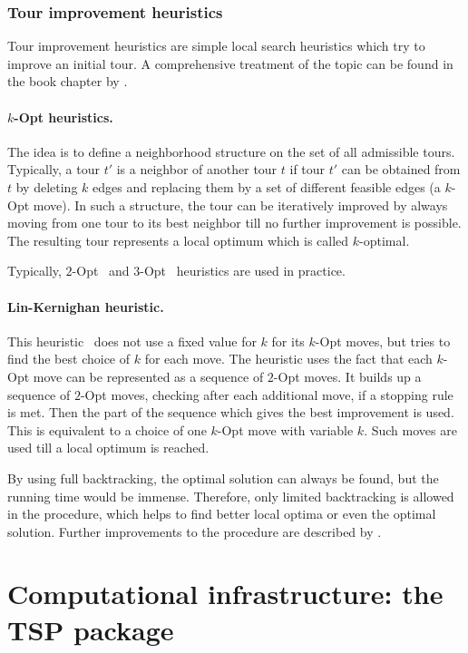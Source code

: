 \documentclass[10pt,a4paper,fleqn]{article}
\begin{document}
\subsubsection{Tour improvement heuristics}

Tour improvement heuristics are simple local search heuristics which try to
improve an initial tour. A comprehensive treatment of the topic
can be found in the book chapter by \cite{Rego2002}.

\paragraph{$k$-Opt heuristics.} The idea is to define a neighborhood structure
on the set of all admissible tours. Typically, a tour $t'$ is a neighbor of
another tour $t$ if tour $t'$ can be obtained from $t$ by deleting $k$ edges
and replacing them by a set of different feasible edges (a $k$-Opt move).  In
such a structure, the tour can be iteratively improved by always moving from
one tour to its best neighbor till no further improvement is possible. The
resulting tour represents a local optimum which is called $k$-optimal.

Typically, $2$-Opt~\citep{Croes1958} and $3$-Opt~\citep{Lin1965} heuristics
are used in practice.

\paragraph{Lin-Kernighan heuristic.}
This heuristic~\citep{Lin1973} does not use a fixed value for $k$ for its
$k$-Opt moves, but tries to find the best choice of $k$ for each move.  The
heuristic uses the fact that each $k$-Opt move can be represented as a sequence
of $2$-Opt moves.  It builds up a sequence of $2$-Opt moves, checking after
each additional move, if a stopping rule is met. Then the part of the sequence
which gives the best improvement is used. This is equivalent to a choice of one
$k$-Opt move with variable $k$. Such moves are used till a local optimum
is reached. 

By using full backtracking, the optimal solution can always be found, but the
running time would be immense. Therefore, only limited backtracking is allowed
in the procedure, which helps to find better local optima or even the optimal
solution. Further improvements to the procedure are described 
by \cite{Lin1973}.


\section{Computational infrastructure: the TSP package}
\label{sec:infrastructure}
\end{document}
